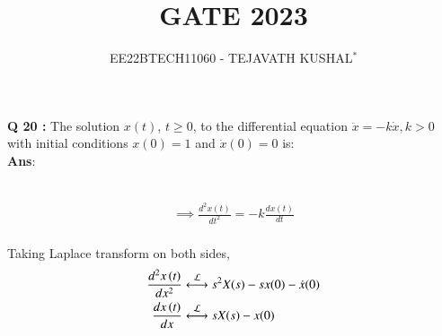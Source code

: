\documentclass[journal,12pt,twocolumn]{IEEEtran}
\theoremstyle{remark}
\begin{document}

\vspace{3cm}

\title{GATE 2023}
\author{EE22BTECH11060 - TEJAVATH KUSHAL$^{*}$%
}
\maketitle
\newpage
\bigskip

\renewcommand{\thefigure}{\theenumi}
\renewcommand{\thetable}{\theenumi}

\maketitle
\noindent \textbf{Q 20 :} The solution \(x(t)\), \(t \geq 0\), to the differential equation
$\ddot{x} = -k\dot{x} , k > 0$
with initial conditions \(x(0) = 1\) and \(\dot{x} (0) = 0\) is: \quad {} \\

\noindent \textbf{Ans}:\\ \\
\begin{table}[h]

\end{table}
\begin{align}
    \implies \frac{d^2 x(t)}{dt^2} = -k\frac{dx(t)}{dt}
\end{align}\\

Taking Laplace transform on both sides,\\
\begin{align}
\label{eq:gate2023.in.20.2}\frac{d^2x\brak{t}}{dx^2} &\system{L}
       s^2X(s)-sx(0)-\dot{x}(0)\\
\label{eq:gate2023.in.20.3}\frac{dx\brak{t}}{dx} &\system{L} sX(s)-x(0)
\end{align}
\end{document}
